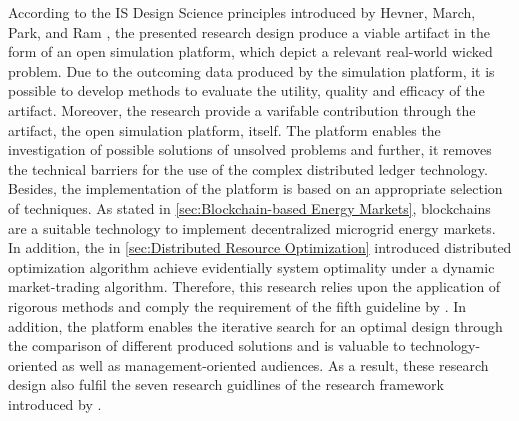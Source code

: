 According to the IS Design Science principles introduced by Hevner, March, Park, and Ram , 
the presented research design produce a viable artifact in the form of an open simulation platform, which depict a 
relevant real-world wicked problem. Due to the outcoming data produced by the simulation platform, 
it is possible to develop methods to evaluate the utility, quality and efficacy of the artifact. 
Moreover, the research provide a varifable contribution through the artifact, the open simulation platform, itself. 
The platform enables the investigation of possible solutions of unsolved problems and further, 
it removes the technical barriers for the use of the complex distributed ledger technology. 
Besides, the implementation of the platform is based on an appropriate selection of techniques. 
As stated in \ref{sec:Blockchain-based Energy Markets}, 
blockchains are a suitable technology to implement decentralized microgrid energy markets. 
In addition, the in \ref{sec:Distributed Resource Optimization} introduced distributed optimization 
algorithm achieve evidentially system optimality under a dynamic market-trading algorithm. 
Therefore, this research relies upon the application of rigorous methods and comply the requirement 
of the fifth guideline by . 
In addition, the platform enables the iterative search for an optimal design through the comparison 
of different produced solutions and is valuable to technology-oriented as well as management-oriented 
audiences. As a result, these research design also fulfil the seven research guidlines of 
the research framework introduced by . 
